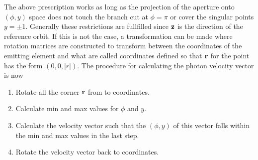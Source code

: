 The above prescription works as long as the projection of the aperture
onto $(\phi, y)$ space does not touch the branch cut at $\phi = \pi$
or cover the singular points $y = \pm 1$. Generally these restrictions
are fullfilled since ${\bf z}$ is the direction of the reference
orbit. If this is not the case, a transformation can be made where
rotation matrices are constructed to transform between the
 coordinates of the emitting element and what are called
 coordinates defined so that ${\bf r}$ for the  point
has the form $(0, 0, |r|)$. The procedure for calculating the photon
velocity vector is now
  \begin{enumerate}
  \item
Rotate all the corner ${\bf r}$ from  to  coordinates.
  \item
Calculate min and max values for $\phi$ and $y$.
  \item
Calculate the velocity vector such that the $(\phi, y)$ of this vector
falls within the min and max values in the last step.
  \item
Rotate the velocity vector back to  coordinates.
  \end{enumerate}

